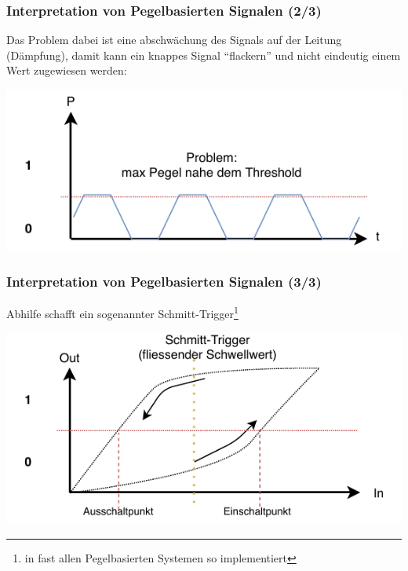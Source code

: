 \documentclass[ignorenonframetext]{beamer}
\begin{document}
\begin{frame}
\frametitle{Interpretation von Pegelbasierten Signalen (2/3)}
Das Problem dabei ist eine abschw\"achung des Signals auf der Leitung (D\"ampfung), damit kann ein knappes Signal ``flackern'' und nicht eindeutig einem Wert zugewiesen werden:

\includegraphics{threshold-soso}
\end{frame}


\begin{frame}
\frametitle{Interpretation von Pegelbasierten Signalen (3/3)}
Abhilfe schafft ein sogenannter Schmitt-Trigger\footnote{in fast allen Pegelbasierten Systemen so implementiert}

\vspace{0.5cm}

\includegraphics{schmitt-trigger}
\end{frame}
\end{document}
